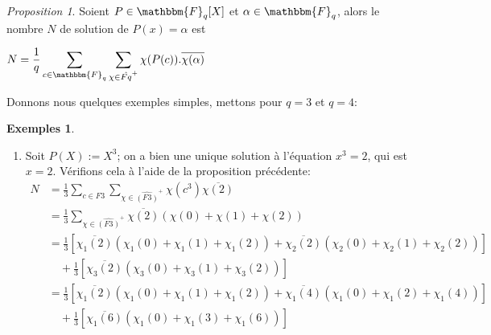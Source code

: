 \documentclass[12pt]{article}
\theoremstyle{remark}\newtheorem{note}{Note}
\theoremstyle{remark}\newtheorem{nota}{Notation}
\newcommand{\Fq}{\mathbbm{F}_q}
\newtheorem{prop}{Proposition}
\theoremstyle{definition}
\newtheorem*{examples}{Exemples}
\begin{document}
\begin{prop}
Soient $P \in \Fq[X]$ et $\alpha \in \Fq$, alors le nombre $N$ de solution de $P(x) = \alpha$ est \begin{center} $N = \displaystyle \frac{1}{q} \sum_{c\in\Fq}\sum_{\chi \in \hat{Fq}^+} \chi(P(c)).\overline{\chi(\alpha)}$ \end{center}
\end{prop}  
\pagebreak

Donnons nous quelques exemples simples, mettons pour $q=3$ et $q=4$:

\begin{examples}
	\begin{enumerate}[label = \roman*)]
	\item Soit $P(X) := X^3$; on a bien une unique solution à l'équation $x^3 = 2$, qui est $x=2$. Vérifions cela à l'aide de la proposition précédente:
\begin{align*}
N &= \displaystyle\frac{1}{3}\sum_{c\in F3}\sum_{\chi\in\hat{(F3)}^+} \chi(c^3)\overline{\chi(2)}\\

&=\displaystyle\frac{1}{3}\sum_{\chi\in\hat{(F3)}^+}\overline{\chi(2)}(\chi(0) + \chi(1) + \chi(2))\\

&=\displaystyle\frac{1}{3}\left[\overline{\chi_1(2)}(\chi_1(0) + \chi_1(1) + \chi_1(2)) + \overline{\chi_2(2)}(\chi_2(0) + \chi_2(1) + \chi_2(2))\right]\\ 

&\hspace{12pt}+\displaystyle\frac{1}{3} \left[\overline{\chi_3(2)}(\chi_3(0) + \chi_3(1) + \chi_3(2))\right]\\

&=\displaystyle\frac{1}{3}\left[\overline{\chi_1(2)}(\chi_1(0) + \chi_1(1) + \chi_1(2)) + \overline{\chi_1(4)}(\chi_1(0) + \chi_1(2) + \chi_1(4))\right]\\

&\hspace{12pt}+\displaystyle\frac{1}{3}\left[\overline{\chi_1(6)}(\chi_1(0) + \chi_1(3) + \chi_1(6))\right]
\end{align*}


\end{enumerate}
\end{examples}
\end{document}
